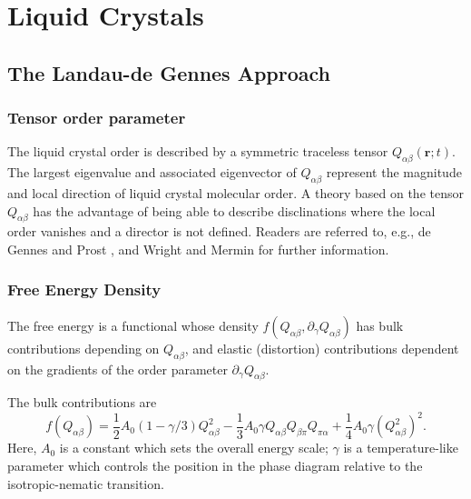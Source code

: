 %
%
%
%
%

\section{Liquid Crystals}
\label{section-lc}

\subsection{The Landau-de Gennes Approach}

\subsubsection{Tensor order parameter}

The liquid crystal order is described by a symmetric traceless tensor
$Q_{\alpha\beta}(\mathbf{r}; t)$. The largest eigenvalue and
associated eigenvector of $Q_{\alpha\beta}$ represent the magnitude
and local direction of liquid crystal molecular order. A theory based
on the tensor $Q_{\alpha\beta}$ has the advantage of being able to
describe disclinations where the local order vanishes and a director
is not defined. Readers are referred to, e.g., de Gennes and Prost
\cite{degennes-prost2002}, and Wright and Mermin \cite{wright-mermin}
for further information.

\subsubsection{Free Energy Density}

The free energy is a functional whose density
$f(Q_{\alpha\beta}, \partial_\gamma Q_{\alpha\beta})$
has bulk contributions depending on $Q_{\alpha\beta}$,
and elastic (distortion) contributions dependent on the
gradients of the order parameter
$\partial_\gamma Q_{\alpha\beta}$.

The bulk contributions are
\begin{equation}
\label{eq-lc-fed-bulk}
f(Q_{\alpha\beta}) =
{\textstyle\frac{1}{2}} A_0 (1 - \gamma / 3) Q_{\alpha\beta}^2
-{\textstyle\frac{1}{3}} A_0 \gamma Q_{\alpha\beta} Q_{\beta\pi} Q_{\pi\alpha}
+ {\textstyle\frac{1}{4}} A_0 \gamma (Q_{\alpha\beta}^2)^2.
\end{equation}
Here, $A_0$ is a constant which sets the overall energy scale; $\gamma$
is a temperature-like parameter which controls the position in the
phase diagram relative to the isotropic-nematic transition.

